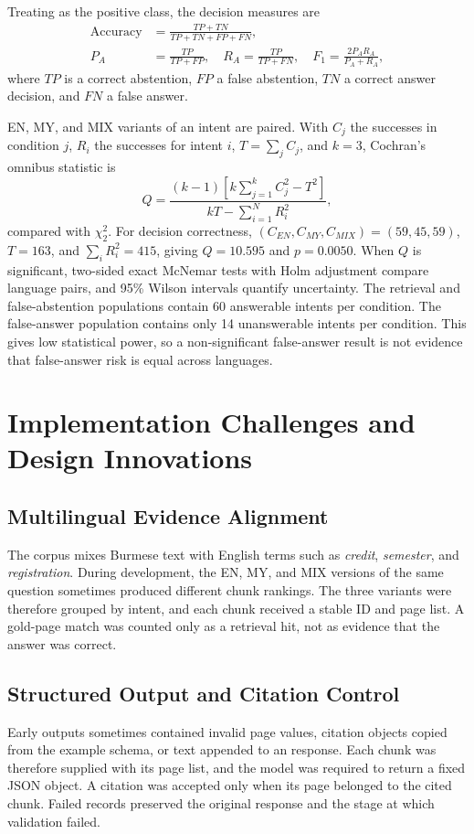 \documentclass[a4paper,conference]{IEEEtran}
\newcommand{\code}[1]{\texttt{\detokenize{#1}}}
\begin{document}
Treating \code{ABSTAIN} as the positive class, the decision measures are
\begin{align}
\operatorname{Accuracy} & =\frac{TP+TN}{TP+TN+FP+FN},\\
P_A & =\frac{TP}{TP+FP},\quad
R_A=\frac{TP}{TP+FN},\quad
F_1=\frac{2P_AR_A}{P_A+R_A},
\label{eq:decision-metrics}
\end{align}
where $TP$ is a correct abstention, $FP$ a false abstention, $TN$ a correct answer decision, and $FN$ a false answer.

EN, MY, and MIX variants of an intent are paired. With $C_j$ the successes in condition $j$, $R_i$ the successes for intent $i$, $T=\sum_jC_j$, and $k=3$, Cochran's omnibus statistic is
\begin{equation}
Q=\frac{(k-1)\left[k\sum_{j=1}^{k}C_j^2-T^2\right]}
{kT-\sum_{i=1}^{N}R_i^2},
\label{eq:cochran-q}
\end{equation}
compared with $\chi^2_{2}$. For decision correctness, $(C_{EN},C_{MY},C_{MIX})=(59,45,59)$, $T=163$, and $\sum_iR_i^2=415$, giving $Q=10.595$ and $p=0.0050$. When $Q$ is significant, two-sided exact McNemar tests with Holm adjustment compare language pairs, and 95\% Wilson intervals quantify uncertainty. The retrieval and false-abstention populations contain 60 answerable intents per condition. The false-answer population contains only 14 unanswerable intents per condition. This gives low statistical power, so a non-significant false-answer result is not evidence that false-answer risk is equal across languages.

\section{Implementation Challenges and Design Innovations}
\subsection{Multilingual Evidence Alignment}
The corpus mixes Burmese text with English terms such as \emph{credit}, \emph{semester}, and \emph{registration}. During development, the EN, MY, and MIX versions of the same question sometimes produced different chunk rankings. The three variants were therefore grouped by intent, and each chunk received a stable ID and page list. A gold-page match was counted only as a retrieval hit, not as evidence that the answer was correct.

\subsection{Structured Output and Citation Control}
Early outputs sometimes contained invalid page values, citation objects copied from the example schema, or text appended to an \code{ABSTAIN} response. Each chunk was therefore supplied with its page list, and the model was required to return a fixed JSON object. A citation was accepted only when its page belonged to the cited chunk. Failed records preserved the original response and the stage at which validation failed.
\end{document}
